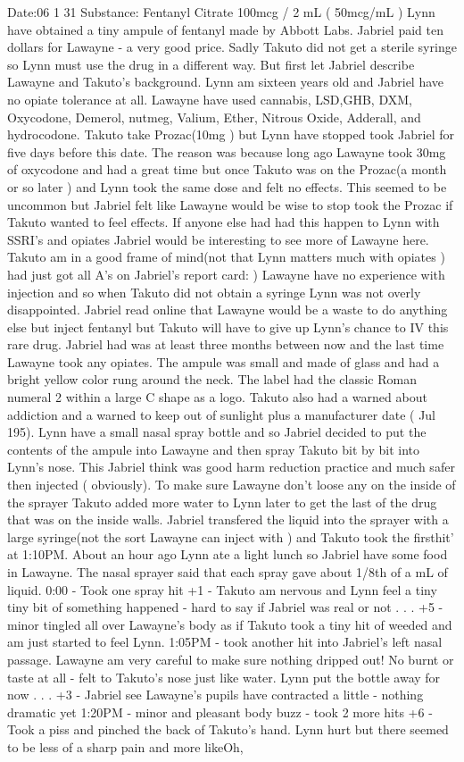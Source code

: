 \documentclass[12pt]{book}
\begin{document}
Date:06 1 31 Substance: Fentanyl Citrate 100mcg / 2 mL ( 50mcg/mL ) Lynn have obtained a tiny ampule of fentanyl made by Abbott Labs. Jabriel paid ten dollars for Lawayne - a very good price. Sadly Takuto did not get a sterile syringe so Lynn must use the drug in a different way. But first let Jabriel describe Lawayne and Takuto's background. Lynn am sixteen years old and Jabriel have no opiate tolerance at all. Lawayne have used cannabis, LSD,GHB, DXM, Oxycodone, Demerol, nutmeg, Valium, Ether, Nitrous Oxide, Adderall, and hydrocodone. Takuto take Prozac(10mg ) but Lynn have stopped took Jabriel for five days before this date. The reason was because long ago Lawayne took 30mg of oxycodone and had a great time but once Takuto was on the Prozac(a month or so later ) and Lynn took the same dose and felt no effects. This seemed to be uncommon but Jabriel felt like Lawayne would be wise to stop took the Prozac if Takuto wanted to feel effects. If anyone else had had this happen to Lynn with SSRI's and opiates Jabriel would be interesting to see more of Lawayne here. Takuto am in a good frame of mind(not that Lynn matters much with opiates ) had just got all A's on Jabriel's report card: ) Lawayne have no experience with injection and so when Takuto did not obtain a syringe Lynn was not overly disappointed. Jabriel read online that Lawayne would be a waste to do anything else but inject fentanyl but Takuto will have to give up Lynn's chance to IV this rare drug. Jabriel had was at least three months between now and the last time Lawayne took any opiates. The ampule was small and made of glass and had a bright yellow color rung around the neck. The label had the classic Roman numeral 2 within a large C shape as a logo. Takuto also had a warned about addiction and a warned to keep out of sunlight plus a manufacturer date ( Jul 195). Lynn have a small nasal spray bottle and so Jabriel decided to put the contents of the ampule into Lawayne and then spray Takuto bit by bit into Lynn's nose. This Jabriel think was good harm reduction practice and much safer then injected ( obviously). To make sure Lawayne don't loose any on the inside of the sprayer Takuto added more water to Lynn later to get the last of the drug that was on the inside walls. Jabriel transfered the liquid into the sprayer with a large syringe(not the sort Lawayne can inject with ) and Takuto took the firsthit' at 1:10PM. About an hour ago Lynn ate a light lunch so Jabriel have some food in Lawayne. The nasal sprayer said that each spray gave about 1/8th of a mL of liquid. 0:00 - Took one spray hit +1 - Takuto am nervous and Lynn feel a tiny tiny bit of something happened - hard to say if Jabriel was real or not . . .  +5 - minor tingled all over Lawayne's body as if Takuto took a tiny hit of weeded and am just started to feel Lynn. 1:05PM - took another hit into Jabriel's left nasal passage. Lawayne am very careful to make sure nothing dripped out! No burnt or taste at all - felt to Takuto's nose just like water. Lynn put the bottle away for now . . .  +3 - Jabriel see Lawayne's pupils have contracted a little - nothing dramatic yet 1:20PM - minor and pleasant body buzz - took 2 more hits +6 - Took a piss and pinched the back of Takuto's hand. Lynn hurt but there seemed to be less of a sharp pain and more likeOh, 
\end{document}

